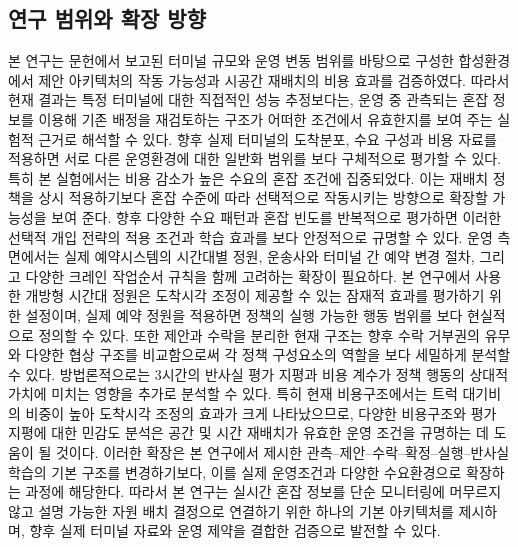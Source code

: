 \subsection{연구 범위와 확장 방향}
\label{sec:scope}
본 연구는 문헌에서 보고된 터미널 규모와 운영 변동 범위를 바탕으로 구성한 합성환경에서
제안 아키텍처의 작동 가능성과 시공간 재배치의 비용 효과를 검증하였다. 따라서 현재
결과는 특정 터미널에 대한 직접적인 성능 추정보다는, 운영 중 관측되는 혼잡 정보를
이용해 기존 배정을 재검토하는 구조가 어떠한 조건에서 유효한지를 보여 주는 실험적
근거로 해석할 수 있다. 향후 실제 터미널의 도착분포, 수요 구성과 비용 자료를 적용하면
서로 다른 운영환경에 대한 일반화 범위를 보다 구체적으로 평가할 수 있다.
특히 본 실험에서는 비용 감소가 높은 수요의 혼잡 조건에 집중되었다. 이는 재배치 정책을
상시 적용하기보다 혼잡 수준에 따라 선택적으로 작동시키는 방향으로 확장할 가능성을
보여 준다. 향후 다양한 수요 패턴과 혼잡 빈도를 반복적으로 평가하면 이러한 선택적 개입
전략의 적용 조건과 학습 효과를 보다 안정적으로 규명할 수 있다.
운영 측면에서는 실제 예약시스템의 시간대별 정원, 운송사와 터미널 간 예약 변경 절차,
그리고 다양한 크레인 작업순서 규칙을 함께 고려하는 확장이 필요하다. 본 연구에서 사용한
개방형 시간대 정원은 도착시각 조정이 제공할 수 있는 잠재적 효과를 평가하기 위한
설정이며, 실제 예약 정원을 적용하면 정책의 실행 가능한 행동 범위를 보다 현실적으로
정의할 수 있다. 또한 제안과 수락을 분리한 현재 구조는 향후 수락 거부권의 유무와 다양한
협상 구조를 비교함으로써 각 정책 구성요소의 역할을 보다 세밀하게 분석할 수 있다.
방법론적으로는 3시간의 반사실 평가 지평과 비용 계수가 정책 행동의 상대적 가치에 미치는
영향을 추가로 분석할 수 있다. 특히 현재 비용구조에서는 트럭 대기비의 비중이 높아
도착시각 조정의 효과가 크게 나타났으므로, 다양한 비용구조와 평가 지평에 대한 민감도
분석은 공간 및 시간 재배치가 유효한 운영 조건을 규명하는 데 도움이 될 것이다.
이러한 확장은 본 연구에서 제시한 관측--제안--수락--확정--실행--반사실 학습의 기본
구조를 변경하기보다, 이를 실제 운영조건과 다양한 수요환경으로 확장하는 과정에 해당한다.
따라서 본 연구는 실시간 혼잡 정보를 단순 모니터링에 머무르지 않고 설명 가능한 자원 배치
결정으로 연결하기 위한 하나의 기본 아키텍처를 제시하며, 향후 실제 터미널 자료와 운영
제약을 결합한 검증으로 발전할 수 있다.
